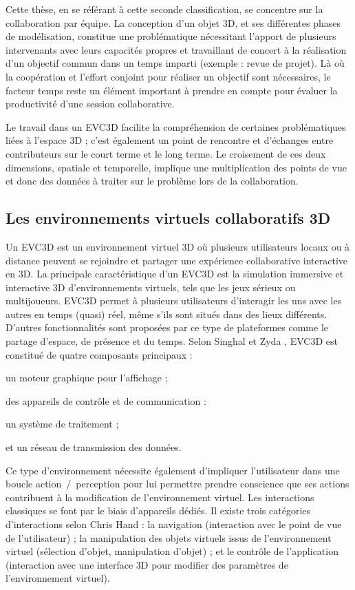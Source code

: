 Cette thèse, en se référant à cette seconde classification, se concentre sur la collaboration par équipe. La conception d'un objet 3D, et ses différentes 
phases de modélisation, constitue une problématique nécessitant l'apport de 
plusieurs intervenants avec leurs capacités propres et travaillant de concert à la 
réalisation d'un objectif commun dans un temps imparti (exemple : revue de 
projet). Là où la coopération et l'effort conjoint pour réaliser un objectif sont 
nécessaires, le facteur temps reste un élément important à prendre en compte 
pour évaluer la productivité d'une session collaborative.

Le travail dans un \gls{EVC3D} facilite la compréhension 
de certaines problématiques liées à l'espace 3D ; c'est également un point de 
rencontre et d'échanges entre contributeurs sur le court terme et le long terme. 
Le croisement de ces deux dimensions, spatiale et temporelle, implique une 
multiplication des points de vue et donc des données à traiter sur le problème lors 
de la collaboration.


\subsection{Les environnements virtuels collaboratifs 3D}

Un \gls{EVC3D} est un environnement virtuel 3D où plusieurs utilisateurs locaux 
ou à distance peuvent se rejoindre et partager une expérience collaborative 
interactive en 3D. La principale caractéristique d'un \gls{EVC3D} est la simulation 
immersive et interactive 3D d'environnements virtuels, tels que les jeux sérieux ou 
multijoueurs. \gls{EVC3D} permet à plusieurs utilisateurs d'interagir les uns avec 
les autres en temps (quasi) réel, même s'ils sont situés dans des lieux différents. 
D'autres fonctionnalités sont proposées par ce type de plateformes comme le 
partage d'espace, de présence et du temps. Selon Singhal et Zyda 
\cite{Singhal1999}, \gls{EVC3D} est constitué de quatre composants principaux :
\begin{enumerate*}[label=(\roman*)]
	\item un moteur graphique pour l'affichage ;
	\item des appareils de contrôle et de communication :
	\item un système de traitement ;
	\item et un réseau de transmission des données. 
\end{enumerate*}

Ce type d'environnement nécessite également d'impliquer l'utilisateur dans une 
boucle \og ac\-tion~/~per\-ception\fg{} pour lui permettre prendre conscience
que ses actions contribuent à la modification de l'environnement virtuel. Les 
interactions classiques se font par le biais d'appareils dédiés.
Il existe trois catégories d'interactions selon Chris Hand \cite{Hand1997}: la 
navigation (interaction avec le point de vue de l'utilisateur) ; la manipulation des 
objets virtuels issus de l'environnement virtuel (sélection d'objet, manipulation 
d'objet) ; et le contrôle de l'application (interaction avec une interface 3D pour 
modifier des paramètres de l'environnement virtuel).

